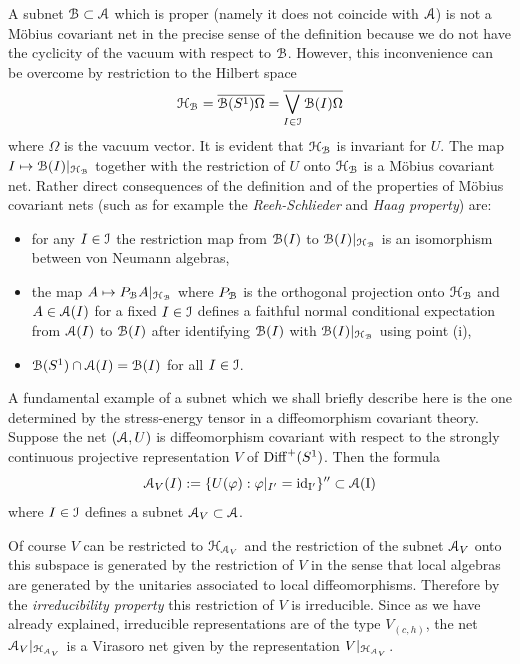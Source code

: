 \documentclass[12pt]{article}
\begin{document}
A subnet ${\mathcal B} \subset {\mathcal A}$ which is proper (namely it does not coincide 
with ${\mathcal A}$)   
is not a M\"obius covariant net in the precise sense of the 
definition because we do not have the cyclicity of 
the vacuum with respect to ${\mathcal B}$. However, this inconvenience
can be overcome by restriction to the Hilbert space 
\begin{equation}
{\mathcal H}_{\mathcal B}=\overline{{\mathcal B}(S^1)\Omega}=\overline{\bigvee_{I \in {\mathcal I}}{\mathcal B}(I)\Omega}
\end{equation}
where $\Omega$ is the vacuum vector.
It is evident that ${\mathcal H}_{\mathcal B}$ is invariant for $U$.
The map $I \mapsto {\mathcal B}(I)|_{{\mathcal H}_{\mathcal B}}$ together with the
restriction of $U$ onto ${\mathcal H}_{\mathcal B}$ is a M\"obius covariant net.
Rather direct consequences of the definition and of the properties of 
M\"obius covariant nets (such as for example the {\it Reeh-Schlieder} and 
{\it Haag property}) are: 
\begin{itemize}
\item[(i)]
for any $I \in {\mathcal I}$ the restriction map from ${\mathcal B}(I)$ to 
${\mathcal B}(I)|_{{\mathcal H}_{\mathcal B}}$ is an isomorphism between von Neumann algebras,
\item[(ii)]
the map $A \mapsto P_{\mathcal B} A |_{{\mathcal H}_{\mathcal B}}$ where $P_{\mathcal B}$ is the orthogonal
projection onto ${\mathcal H}_{\mathcal B}$ and $A \in {\mathcal A}(I)$ for a fixed $I \in {\mathcal I}$ defines
a faithful normal conditional expectation from ${\mathcal A}(I)$ to ${\mathcal B}(I)$
after identifying ${\mathcal B}(I)$ with ${\mathcal B}(I)|_{{\mathcal H}_{\mathcal B}}$ using point (i),
\item[(iii)]
${\mathcal B}(S^1) \cap {\mathcal A}(I) = {\mathcal B}(I)$ for all $I \in {\mathcal I}$.
\end{itemize}

A fundamental example of a subnet which we shall briefly describe 
here is the one determined by the stress-energy tensor in a
diffeomorphism covariant theory. Suppose the net $({\mathcal A},U)$ is
diffeomorphism covariant with respect to the strongly continuous
projective representation $V$ of ${{\rm Diff}^+(S^1)}$. Then the formula
\begin{equation}
{\mathcal A}_V(I):=\{U(\varphi): \varphi|_{I'}=\rm{id}_{I'}\}'' 
\subset {\mathcal A}(I)
\end{equation}
where $I \in {\mathcal I}$ defines a subnet ${\mathcal A}_V \subset {\mathcal A}$. 

Of course $V$ can be restricted to ${\mathcal H}_{{\mathcal A}_V}$ and the 
restriction of the subnet ${\mathcal A}_V$ onto this subspace
is generated by the restriction of $V$ in the sense that
local algebras are generated by the unitaries associated 
to local diffeomorphisms. Therefore by the {\it irreducibility
property} this restriction of $V$ is irreducible. Since as we have
already explained, irreducible representations are of the type 
$V_{(c,h)}$, the net ${\mathcal A}_V|_{{\mathcal H}_{{\mathcal A}_V}}$ is a Virasoro net
given by the representation $V|_{{\mathcal H}_{{\mathcal A}_V}}$.
\end{document}
